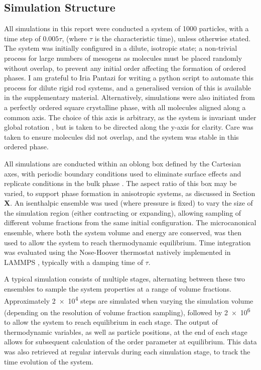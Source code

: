 \documentclass[11pt, a4paper]{article} %
\begin{document}
\subsection{Simulation Structure} %
All simulations in this report were conducted a system of 1000 particles, with a time step of $0.005\tau$, (where $\tau$ is the characteristic time), unless otherwise stated. The system was initially configured in a dilute, isotropic state; a non-trivial process for large numbers of mesogens as molecules must be placed randomly without overlap, to prevent any initial order affecting the formation of ordered phases. I am grateful to Iria Pantazi for writing a python script to automate this process for dilute rigid rod systems, and a generalised version of this is available in the supplementary material. Alternatively, simulations were also initiated from a perfectly ordered square crystalline phase, with all molecules aligned along a common axis. The choice of this axis is arbitrary, as the system is invariant under global rotation \cite{Nos1983}, but is taken to be directed along the y-axis for clarity. Care was taken to ensure molecules did not overlap, and the system was stable in this ordered phase.

All simulations are conducted within an oblong box defined by the Cartesian axes, with periodic boundary conditions used to eliminate surface effects and replicate conditions in the bulk phase \cite{Frenkel2002}. The aspect ratio of this box may be varied, to support phase formation in anisotropic systems, as discussed in Section \textbf{X}. An isenthalpic ensemble was used (where pressure is fixed) to vary the size of the simulation region (either contracting or expanding), allowing sampling of different volume fractions from the same initial configuration. The microcanonical ensemble, where both the system volume and energy are conserved, was then used to allow the system to reach thermodynamic equilibrium. Time integration was evaluated using the Nose-Hoover thermostat \cite{Nos1984, Hoover1985} natively implemented in LAMMPS \cite{Shinoda2004}, typically with a damping time of $\tau$.

A typical simulation consists of multiple stages, alternating between these two ensembles to sample the system properties at a range of volume fractions. Approximately \num{2e4} steps are simulated when varying the simulation volume (depending on the resolution of volume fraction sampling), followed by \num{2e6} to allow the system to reach equilibrium in each stage. The output of thermodynamic variables, as well as particle positions, at the end of each stage allows for subsequent calculation of the order parameter at equilibrium. This data was also retrieved at regular intervals during each simulation stage, to track the time evolution of the system.
\end{document}
